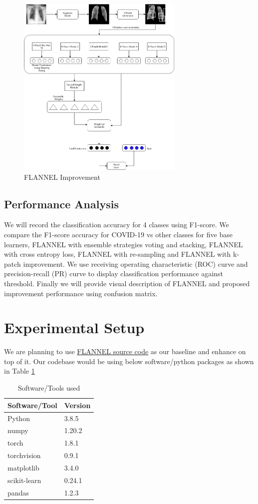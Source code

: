 \documentclass{sigkddExp}
\begin{document}
\begin{figure}[h]
    \includegraphics[width=8cm]{../doc/images/FLANNEL-IMPROVED.png}
    \caption{FLANNEL Improvement}
    \label{fig:improve}
\end{figure}

\subsection{Performance Analysis}
We will record the classification accuracy for 4 classes using F1-score. We
compare the F1-score accuracy for COVID-19 vs other classes for five base
learners, FLANNEL with ensemble strategies voting and stacking, FLANNEL with
cross entropy loss, FLANNEL with re-sampling and FLANNEL with k-patch
improvement. We use receiving operating characteristic (ROC) curve and
precision-recall (PR) curve to display classification performance against
threshold. Finally we will provide visual description of FLANNEL and proposed
improvement performance using confusion matrix.

\section{Experimental Setup}
We are planning to use \href{https://github.com/qxiaobu/FLANNEL} {FLANNEL source
    code}  as our baseline and enhance on top of it. Our codebase would be
using below software/python packages as shown in Table \ref{table:package}
\begin{table}[h]
    \centering
    \caption{Software/Tools used}
    \label{table:package}
    \begin{tabular}{|l|l|} \hline
        Software/Tool & Version \\ \hline
        Python        & 3.8.5   \\ \hline
        numpy         & 1.20.2  \\ \hline
        torch         & 1.8.1   \\ \hline
        torchvision   & 0.9.1   \\ \hline
        matplotlib    & 3.4.0   \\ \hline
        scikit-learn  & 0.24.1  \\ \hline
        pandas        & 1.2.3   \\
        \hline\end{tabular}
\end{table}
\end{document}

